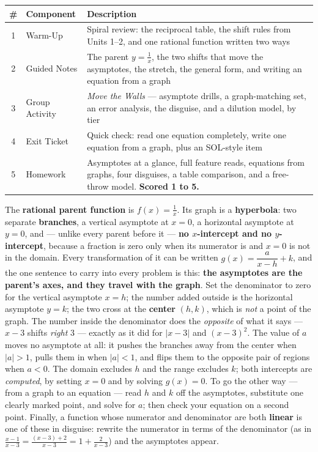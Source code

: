 \documentclass[10pt]{article}
\begin{document}
\begin{tocbox}
\small
\renewcommand{\arraystretch}{1.5}
\begin{tabularx}{\linewidth}{@{} c l X @{}}
\rowcolor{forestbg}
\textbf{\#} & \textbf{Component} & \textbf{Description} \\
\midrule
1 & Warm-Up        & Spiral review: the reciprocal table, the shift rules from Units 1--2, and one rational function written two ways \\
2 & Guided Notes   & The parent $y=\frac1x$, the two shifts that move the asymptotes, the stretch, the general form, and writing an equation from a graph \\
3 & Group Activity & \emph{Move the Walls} --- asymptote drills, a graph-matching set, an error analysis, the disguise, and a dilution model, by tier \\
4 & Exit Ticket    & Quick check: read one equation completely, write one equation from a graph, plus an SOL-style item \\
5 & Homework       & Asymptotes at a glance, full feature reads, equations from graphs, four disguises, a table comparison, and a free-throw model. \textbf{Scored 1 to 5.} \\
\end{tabularx}
\end{tocbox}

\vspace{0.10in}

\begin{remindbox}
\small The \textbf{rational parent function} is $f(x)=\frac1x$. Its graph is a \textbf{hyperbola}: two
separate \textbf{branches}, a vertical asymptote at $x=0$, a horizontal asymptote at $y=0$, and --- unlike
every parent before it --- \textbf{no $x$-intercept and no $y$-intercept}, because a fraction is zero only
when its numerator is and $x=0$ is not in the domain. Every transformation of it can be written
$g(x)=\dfrac{a}{x-h}+k$, and the one sentence to carry into every problem is this: \textbf{the asymptotes
are the parent's axes, and they travel with the graph}. Set the denominator to zero for the vertical
asymptote $x=h$; the number added outside is the horizontal asymptote $y=k$; the two cross at the
\textbf{center} $(h,k)$, which is \emph{not} a point of the graph. The number inside the denominator does
the \emph{opposite} of what it says --- $x-3$ shifts \emph{right} $3$ --- exactly as it did for
$|x-3|$ and $(x-3)^2$. The value of $a$ moves no asymptote at all: it pushes the branches away from the
center when $|a|>1$, pulls them in when $|a|<1$, and flips them to the opposite pair of regions when
$a<0$. The domain excludes $h$ and the range excludes $k$; both intercepts are \emph{computed}, by
setting $x=0$ and by solving $g(x)=0$. To go the other way --- from a graph to an equation --- read $h$
and $k$ off the asymptotes, substitute one clearly marked point, and solve for $a$; then check your
equation on a second point. Finally, a function whose numerator and denominator are both \textbf{linear}
is one of these in disguise: rewrite the numerator in terms of the denominator (as in
$\frac{x-1}{x-3}=\frac{(x-3)+2}{x-3}=1+\frac{2}{x-3}$) and the asymptotes appear.
\end{remindbox}
\end{document}
